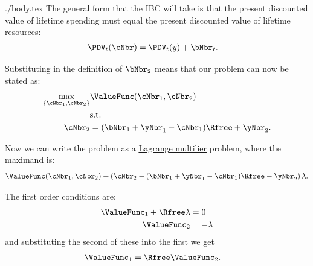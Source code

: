 \documentclass{handout}
\begin{document}
\begin{verbatimwrite}{./body.tex}
  The general form that the IBC will take is that the present
  discounted value of lifetime spending must equal the present
  discounted value of lifetime resources:
  \begin{equation}\begin{gathered}\begin{aligned}
        \PDV_{t}(\cNbr) & =  \PDV_{t}(y)+\bNbr_{t}. \label{eq:ibcgen}
      \end{aligned}\end{gathered}\end{equation}

  Substituting in the definition of $\bNbr_{2}$ means that our problem
  can now be stated as:
  \begin{equation}\begin{gathered}\begin{aligned}
        \max_{\{\cNbr_{1},\cNbr_{2}\}} &   \ValueFunc(\cNbr_{1},\cNbr_{2})  \\
        & \mbox{s.t.}    \nonumber \\
        \cNbr_{2} & =  (\bNbr_{1}+\yNbr_{1}-\cNbr_{1})\Rfree+\yNbr_{2}.
      \end{aligned}\end{gathered}\end{equation}

  Now we can write the problem as a \href{https://en.wikipedia.org/wiki/Lagrange_multiplier}{Lagrange multilier} problem, where the maximand is:
  \begin{equation}
    \ValueFunc(\cNbr_{1},\cNbr_{2}) + \left(  \cNbr_{2}- (\bNbr_{1}+\yNbr_{1}-\cNbr_{1})\Rfree-\yNbr_{2}\right)\lambda.
  \end{equation}

  The first order conditions are:
  \begin{equation}\begin{gathered}\begin{aligned}
        \ValueFunc_{1} + \Rfree\lambda & =  0  \label{eq:lagrange1}\\
        \ValueFunc_{2} & =  -\lambda 
      \end{aligned}\end{gathered}\end{equation}
  and substituting the second of these into the first we get
  \begin{equation}\begin{gathered}\begin{aligned}
        \ValueFunc_{1} & =  \Rfree \ValueFunc_{2} \label{eq:timeprice}.
      \end{aligned}\end{gathered}\end{equation}


\end{verbatimwrite}
\end{document}
